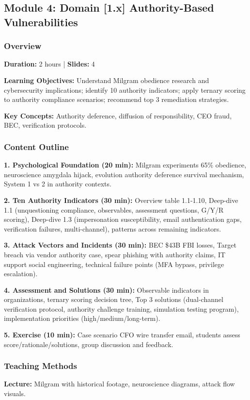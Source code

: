 \documentclass[11pt,a4paper]{article}
\begin{document}
\subsection{Module 4: Domain [1.x] Authority-Based Vulnerabilities}

\subsubsection{Overview}
\textbf{Duration:} 2 hours | \textbf{Slides:} 4

\textbf{Learning Objectives:} Understand Milgram obedience research and cybersecurity implications; identify 10 authority indicators; apply ternary scoring to authority compliance scenarios; recommend top 3 remediation strategies.

\textbf{Key Concepts:} Authority deference, diffusion of responsibility, CEO fraud, BEC, verification protocols.

\subsubsection{Content Outline}
\textbf{1. Psychological Foundation (20 min):} Milgram experiments 65\% obedience, neuroscience amygdala hijack, evolution authority deference survival mechanism, System 1 vs 2 in authority contexts.

\textbf{2. Ten Authority Indicators (30 min):} Overview table 1.1-1.10, Deep-dive 1.1 (unquestioning compliance, observables, assessment questions, G/Y/R scoring), Deep-dive 1.3 (impersonation susceptibility, email authentication gaps, verification failures, multi-channel), patterns across remaining indicators.

\textbf{3. Attack Vectors and Incidents (30 min):} BEC \$43B FBI losses, Target breach via vendor authority case, spear phishing with authority claims, IT support social engineering, technical failure points (MFA bypass, privilege escalation).

\textbf{4. Assessment and Solutions (30 min):} Observable indicators in organizations, ternary scoring decision tree, Top 3 solutions (dual-channel verification protocol, authority challenge training, simulation testing program), implementation priorities (high/medium/long-term).

\textbf{5. Exercise (10 min):} Case scenario CFO wire transfer email, students assess score/rationale/solutions, group discussion and feedback.

\subsubsection{Teaching Methods}
\textbf{Lecture:} Milgram with historical footage, neuroscience diagrams, attack flow visuals.
\end{document}
